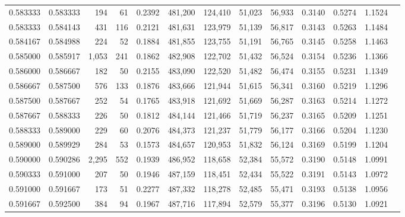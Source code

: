 \begin{tabular}{rrrrrrrrrrrrr}
0.583333 & 0.583333 &   194 &  61 &                                     0.2392 & 481,200 & 124,410 &  51,023 &  56,933 & 0.3140 & 0.5274 & 1.1524 \\
0.583333 & 0.584143 &   431 & 116 &                                     0.2121 & 481,631 & 123,979 &  51,139 &  56,817 & 0.3143 & 0.5263 & 1.1484 \\
0.584167 & 0.584988 &   224 &  52 &                                     0.1884 & 481,855 & 123,755 &  51,191 &  56,765 & 0.3145 & 0.5258 & 1.1463 \\
0.585000 & 0.585917 & 1,053 & 241 &                                     0.1862 & 482,908 & 122,702 &  51,432 &  56,524 & 0.3154 & 0.5236 & 1.1366 \\
0.586000 & 0.586667 &   182 &  50 &                                     0.2155 & 483,090 & 122,520 &  51,482 &  56,474 & 0.3155 & 0.5231 & 1.1349 \\
0.586667 & 0.587500 &   576 & 133 &                                     0.1876 & 483,666 & 121,944 &  51,615 &  56,341 & 0.3160 & 0.5219 & 1.1296 \\
0.587500 & 0.587667 &   252 &  54 &                                     0.1765 & 483,918 & 121,692 &  51,669 &  56,287 & 0.3163 & 0.5214 & 1.1272 \\
0.587667 & 0.588333 &   226 &  50 &                                     0.1812 & 484,144 & 121,466 &  51,719 &  56,237 & 0.3165 & 0.5209 & 1.1251 \\
0.588333 & 0.589000 &   229 &  60 &                                     0.2076 & 484,373 & 121,237 &  51,779 &  56,177 & 0.3166 & 0.5204 & 1.1230 \\
0.589000 & 0.589929 &   284 &  53 &                                     0.1573 & 484,657 & 120,953 &  51,832 &  56,124 & 0.3169 & 0.5199 & 1.1204 \\
0.590000 & 0.590286 & 2,295 & 552 &                                     0.1939 & 486,952 & 118,658 &  52,384 &  55,572 & 0.3190 & 0.5148 & 1.0991 \\
0.590333 & 0.591000 &   207 &  50 &                                     0.1946 & 487,159 & 118,451 &  52,434 &  55,522 & 0.3191 & 0.5143 & 1.0972 \\
0.591000 & 0.591667 &   173 &  51 &                                     0.2277 & 487,332 & 118,278 &  52,485 &  55,471 & 0.3193 & 0.5138 & 1.0956 \\
0.591667 & 0.592500 &   384 &  94 &                                     0.1967 & 487,716 & 117,894 &  52,579 &  55,377 & 0.3196 & 0.5130 & 1.0921 \\

\end{tabular}
